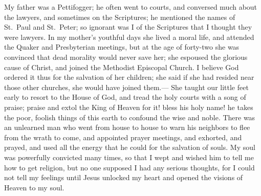 \documentclass{article}
\renewcommand\footnote[1]{} %
\begin{document}
My father was a Pettifogger; he often went to courts, and conversed much about the lawyers, and sometimes on the Scriptures; he mentioned the names of St.\ Paul and St.\ Peter; so ignorant was I of the Scriptures that I thought they were lawyers.
In my mother's\footnote{Dierus Hollister, 1765--1843} youthful days she lived a moral life, and attended the Quaker and Presbyterian meetings, but at the age of forty-two\footnote{in the year 1807} she was convinced that dead morality would never save her; she espoused the glorious cause of Christ, and joined the Methodist Episcopal Church.
I believe God ordered it thus for the salvation of her children; she said if she had resided near those other churches, she would have joined them.---
She taught our little feet early to resort to the House of God, and tread the holy courts with a song of praise; praise and extol the King of Heaven for it! bless his holy name! he takes the poor, foolish things of this earth to confound the wise and noble.
There was an unlearned man who went from house to house to warn his neighbors to flee from the wrath to come, and appointed prayer meetings, and exhorted, and prayed, and used all the energy that he could for the salvation of souls.
My soul was powerfully convicted many times, so that I wept and wished him to tell me how to get religion, but no one supposed I had any serious thoughts, for I could not tell my feelings until Jesus unlocked my heart and opened the visions of Heaven to my soul.
\end{document}
